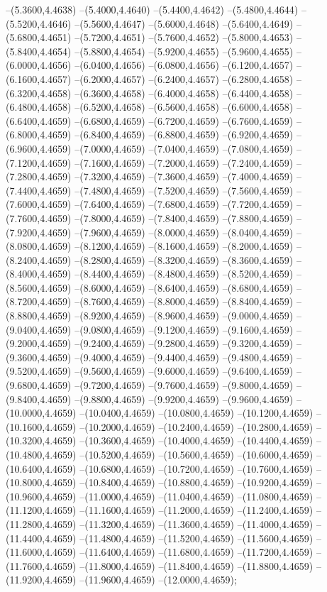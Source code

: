 {	--(5.3600,4.4638)
	--(5.4000,4.4640)
	--(5.4400,4.4642)
	--(5.4800,4.4644)
	--(5.5200,4.4646)
	--(5.5600,4.4647)
	--(5.6000,4.4648)
	--(5.6400,4.4649)
	--(5.6800,4.4651)
	--(5.7200,4.4651)
	--(5.7600,4.4652)
	--(5.8000,4.4653)
	--(5.8400,4.4654)
	--(5.8800,4.4654)
	--(5.9200,4.4655)
	--(5.9600,4.4655)
	--(6.0000,4.4656)
	--(6.0400,4.4656)
	--(6.0800,4.4656)
	--(6.1200,4.4657)
	--(6.1600,4.4657)
	--(6.2000,4.4657)
	--(6.2400,4.4657)
	--(6.2800,4.4658)
	--(6.3200,4.4658)
	--(6.3600,4.4658)
	--(6.4000,4.4658)
	--(6.4400,4.4658)
	--(6.4800,4.4658)
	--(6.5200,4.4658)
	--(6.5600,4.4658)
	--(6.6000,4.4658)
	--(6.6400,4.4659)
	--(6.6800,4.4659)
	--(6.7200,4.4659)
	--(6.7600,4.4659)
	--(6.8000,4.4659)
	--(6.8400,4.4659)
	--(6.8800,4.4659)
	--(6.9200,4.4659)
	--(6.9600,4.4659)
	--(7.0000,4.4659)
	--(7.0400,4.4659)
	--(7.0800,4.4659)
	--(7.1200,4.4659)
	--(7.1600,4.4659)
	--(7.2000,4.4659)
	--(7.2400,4.4659)
	--(7.2800,4.4659)
	--(7.3200,4.4659)
	--(7.3600,4.4659)
	--(7.4000,4.4659)
	--(7.4400,4.4659)
	--(7.4800,4.4659)
	--(7.5200,4.4659)
	--(7.5600,4.4659)
	--(7.6000,4.4659)
	--(7.6400,4.4659)
	--(7.6800,4.4659)
	--(7.7200,4.4659)
	--(7.7600,4.4659)
	--(7.8000,4.4659)
	--(7.8400,4.4659)
	--(7.8800,4.4659)
	--(7.9200,4.4659)
	--(7.9600,4.4659)
	--(8.0000,4.4659)
	--(8.0400,4.4659)
	--(8.0800,4.4659)
	--(8.1200,4.4659)
	--(8.1600,4.4659)
	--(8.2000,4.4659)
	--(8.2400,4.4659)
	--(8.2800,4.4659)
	--(8.3200,4.4659)
	--(8.3600,4.4659)
	--(8.4000,4.4659)
	--(8.4400,4.4659)
	--(8.4800,4.4659)
	--(8.5200,4.4659)
	--(8.5600,4.4659)
	--(8.6000,4.4659)
	--(8.6400,4.4659)
	--(8.6800,4.4659)
	--(8.7200,4.4659)
	--(8.7600,4.4659)
	--(8.8000,4.4659)
	--(8.8400,4.4659)
	--(8.8800,4.4659)
	--(8.9200,4.4659)
	--(8.9600,4.4659)
	--(9.0000,4.4659)
	--(9.0400,4.4659)
	--(9.0800,4.4659)
	--(9.1200,4.4659)
	--(9.1600,4.4659)
	--(9.2000,4.4659)
	--(9.2400,4.4659)
	--(9.2800,4.4659)
	--(9.3200,4.4659)
	--(9.3600,4.4659)
	--(9.4000,4.4659)
	--(9.4400,4.4659)
	--(9.4800,4.4659)
	--(9.5200,4.4659)
	--(9.5600,4.4659)
	--(9.6000,4.4659)
	--(9.6400,4.4659)
	--(9.6800,4.4659)
	--(9.7200,4.4659)
	--(9.7600,4.4659)
	--(9.8000,4.4659)
	--(9.8400,4.4659)
	--(9.8800,4.4659)
	--(9.9200,4.4659)
	--(9.9600,4.4659)
	--(10.0000,4.4659)
	--(10.0400,4.4659)
	--(10.0800,4.4659)
	--(10.1200,4.4659)
	--(10.1600,4.4659)
	--(10.2000,4.4659)
	--(10.2400,4.4659)
	--(10.2800,4.4659)
	--(10.3200,4.4659)
	--(10.3600,4.4659)
	--(10.4000,4.4659)
	--(10.4400,4.4659)
	--(10.4800,4.4659)
	--(10.5200,4.4659)
	--(10.5600,4.4659)
	--(10.6000,4.4659)
	--(10.6400,4.4659)
	--(10.6800,4.4659)
	--(10.7200,4.4659)
	--(10.7600,4.4659)
	--(10.8000,4.4659)
	--(10.8400,4.4659)
	--(10.8800,4.4659)
	--(10.9200,4.4659)
	--(10.9600,4.4659)
	--(11.0000,4.4659)
	--(11.0400,4.4659)
	--(11.0800,4.4659)
	--(11.1200,4.4659)
	--(11.1600,4.4659)
	--(11.2000,4.4659)
	--(11.2400,4.4659)
	--(11.2800,4.4659)
	--(11.3200,4.4659)
	--(11.3600,4.4659)
	--(11.4000,4.4659)
	--(11.4400,4.4659)
	--(11.4800,4.4659)
	--(11.5200,4.4659)
	--(11.5600,4.4659)
	--(11.6000,4.4659)
	--(11.6400,4.4659)
	--(11.6800,4.4659)
	--(11.7200,4.4659)
	--(11.7600,4.4659)
	--(11.8000,4.4659)
	--(11.8400,4.4659)
	--(11.8800,4.4659)
	--(11.9200,4.4659)
	--(11.9600,4.4659)
	--(12.0000,4.4659);
}

